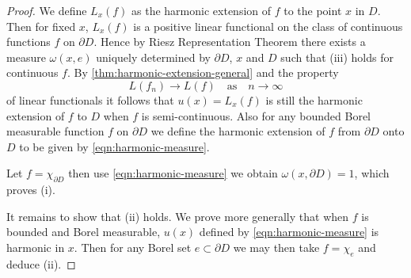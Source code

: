 \begin{proof}
	We define $L_x(f)$ as the harmonic extension of $f$ to the point $x$ in $D$. Then for fixed $x$, $L_x(f)$ is a positive linear functional on the class of continuous functions $f$ on $\partial D$. Hence by Riesz Representation Theorem there exists a measure $\omega(x,e)$ uniquely determined by $\partial D$, $x$ and $D$ such that (iii) holds for continuous  $f$. By \cref{thm:harmonic-extension-general} and the property
	\[
	L(f_n)\to L(f)\quad \text{as}\quad n\to \infty
	\] 
	of linear functionals it follows that $u(x)=L_x(f)$ is still the harmonic extension of $f$ to $D$ when $f$ is semi-continuous. Also for any bounded Borel measurable function $f$ on $\partial D$ we define the harmonic extension of $f$ from $\partial D$ onto $D$ to be given by \cref{eqn:harmonic-measure}. 

	Let $f=\chi_{\partial D}$ then use \cref{eqn:harmonic-measure} we obtain $\omega(x,\partial D)=1$, which proves (i).

	It remains to show that (ii) holds. We prove more generally that when $f$ is bounded and Borel measurable, $u(x)$ defined by \cref{eqn:harmonic-measure} is harmonic in $x$. Then for any Borel set $e\subset \partial D$ we may then take $f=\chi_{e}$ and deduce (ii).


\end{proof}
